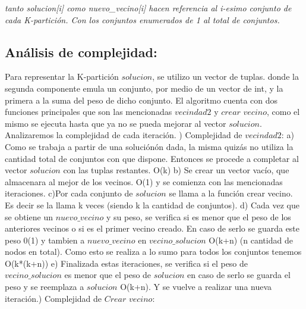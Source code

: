 \documentclass[a4paper]{article}
\begin{document}
 \textit {tanto solucion[i] como nuevo\_vecino[i] hacen referencia al i-esimo conjunto de cada K-partici\'on. Con los conjuntos enumerados de 1 al total de conjuntos.}
 
\subsection{An\'alisis de complejidad:}
 
Para representar la K-partici\'on $solucion$, se utilizo un vector de tuplas. donde la segunda componente emula un conjunto, por medio de un vector de int, y la primera a la suma del peso de dicho conjunto. 
El algoritmo cuenta con dos funciones principales que son las mencionadas $vecindad2$ y $crear$ $vecino$, como el mismo se ejecuta hasta que ya no se pueda mejorar al vector $solucion$. Analizaremos la complejidad de cada iteraci\'on.  \newline {}) Complejidad de $vecindad2$:\newline
a) Como se trabaja a partir de una soluci\'on\'on dada, la misma quiz\'as no utiliza la cantidad total de conjuntos con que dispone. Entonces se procede a completar al vector $solucion$ con las tuplas restantes. O(k)\newline
b) Se crear un vector vac\'io, que almacenara al mejor de los vecinos. O(1) y se comienza con las mencionadas iteraciones. \newline
c)Por cada conjunto de $solucion$ se llama a la funci\'on crear vecino. Es decir se la llama k veces (siendo k la cantidad de conjuntos). \newline
d) Cada vez que se obtiene un $nuevo\_vecino$ y su peso, se verifica si es menor que el peso de los anteriores vecinos o si es el primer vecino creado. En caso de serlo se guarda este peso 0(1) y tambien a $nuevo\_vecino$ en $vecino\_solucion$ O(k+n) (n cantidad de nodos en total). Como esto se realiza a lo sumo para todos los conjuntos tenemos O(k*(k+n))\newline
e) Finalizada estas iteraciones, se verifica si el peso de $vecino\_solucion$ es menor que el peso de $solucion$ en caso de serlo se guarda el peso y se reemplaza a $solucion$ O(k+n). Y se vuelve a realizar una nueva iteraci\'on.\newline {}) Complejidad de $Crear$ $vecino$: \newline
\end{document}
